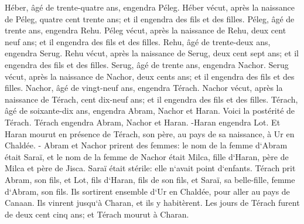 \verse Héber, âgé de trente-quatre ans, engendra Péleg. 
\verse Héber vécut, après la naissance de Péleg, quatre cent trente ans; et il engendra des fils et des filles. 
\verse Péleg, âgé de trente ans, engendra Rehu. 
\verse Péleg vécut, après la naissance de Rehu, deux cent neuf ans; et il engendra des fils et des filles. 
\verse Rehu, âgé de trente-deux ans, engendra Serug. 
\verse Rehu vécut, après la naissance de Serug, deux cent sept ans; et il engendra des fils et des filles. 
\verse Serug, âgé de trente ans, engendra Nachor. 
\verse Serug vécut, après la naissance de Nachor, deux cents ans; et il engendra des fils et des filles. 
\verse Nachor, âgé de vingt-neuf ans, engendra Térach. 
\verse Nachor vécut, après la naissance de Térach, cent dix-neuf ans; et il engendra des fils et des filles. 
\verse Térach, âgé de soixante-dix ans, engendra Abram, Nachor et Haran. 
\verse Voici la postérité de Térach. Térach engendra Abram, Nachor et Haran. -Haran engendra Lot. 
\verse Et Haran mourut en présence de Térach, son père, au pays de sa naissance, à Ur en Chaldée. - 
\verse Abram et Nachor prirent des femmes: le nom de la femme d`Abram était Saraï, et le nom de la femme de Nachor était Milca, fille d`Haran, père de Milca et père de Jisca. 
\verse Saraï était stérile: elle n`avait point d`enfants. 
\verse Térach prit Abram, son fils, et Lot, fils d`Haran, fils de son fils, et Saraï, sa belle-fille, femme d`Abram, son fils. Ils sortirent ensemble d`Ur en Chaldée, pour aller au pays de Canaan. Ils vinrent jusqu`à Charan, et ils y habitèrent. 
\verse Les jours de Térach furent de deux cent cinq ans; et Térach mourut à Charan. 

